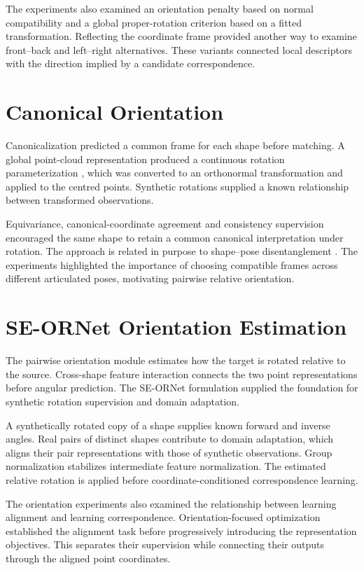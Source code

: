 The experiments also examined an orientation penalty based on normal compatibility and a global proper-rotation criterion based on a fitted transformation. Reflecting the coordinate frame provided another way to examine front--back and left--right alternatives. These variants connected local descriptors with the direction implied by a candidate correspondence.

\section{Canonical Orientation}
\label{app:canonical}
Canonicalization predicted a common frame for each shape before matching. A global point-cloud representation produced a continuous rotation parameterization \citep{Zhou_2019_CVPR}, which was converted to an orthonormal transformation and applied to the centred points. Synthetic rotations supplied a known relationship between transformed observations.

Equivariance, canonical-coordinate agreement and consistency supervision encouraged the same shape to retain a common canonical interpretation under rotation. The approach is related in purpose to shape--pose disentanglement \citep{Katzir_2022_ShapePose}. The experiments highlighted the importance of choosing compatible frames across different articulated poses, motivating pairwise relative orientation.

\section{SE-ORNet Orientation Estimation}
\label{app:oem}
The pairwise orientation module estimates how the target is rotated relative to the source. Cross-shape feature interaction connects the two point representations before angular prediction. The SE-ORNet formulation \citep{Deng_2023_CVPR} supplied the foundation for synthetic rotation supervision and domain adaptation.

A synthetically rotated copy of a shape supplies known forward and inverse angles. Real pairs of distinct shapes contribute to domain adaptation, which aligns their pair representations with those of synthetic observations. Group normalization \citep{Wu_2018_GroupNorm} stabilizes intermediate feature normalization. The estimated relative rotation is applied before coordinate-conditioned correspondence learning.

The orientation experiments also examined the relationship between learning alignment and learning correspondence. Orientation-focused optimization established the alignment task before progressively introducing the representation objectives. This separates their supervision while connecting their outputs through the aligned point coordinates.


